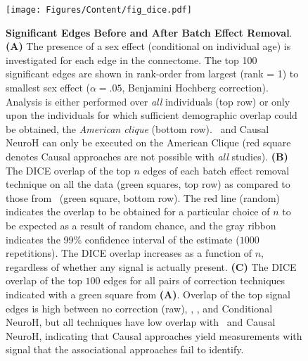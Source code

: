 \begin{figure}[h!]
    \centering
    \texttt{[image: Figures/Content/fig\_dice.pdf]}
    \caption{\textbf{Significant Edges Before and After Batch Effect Removal}. \textbf{(A)} The presence of a sex effect (conditional on individual age) is investigated for each edge in the connectome. The top 100 significant edges are shown in rank-order from largest (rank = 1) to smallest sex effect ($\alpha = .05$, Benjamini Hochberg \cite{BH} correction). Analysis is either performed over \textit{all} individuals (top row) or only upon the individuals for which sufficient demographic overlap could be obtained, the \textit{American clique} (bottom row). \cccombat~and Causal NeuroH can only be executed on the American Clique (red square denotes Causal approaches are not possible with \textit{all} studies). \textbf{(B)} The DICE overlap of the top $n$ edges of each batch effect removal technique on all the data (green squares, top row) as compared to those from \cccombat~(green square, bottom row). The red line (random) indicates the overlap to be obtained for a particular choice of $n$ to be expected as a result of random chance, and the gray ribbon indicates the 99\% confidence interval of the estimate ($1000$ repetitions). The DICE overlap increases as a function of $n$, regardless of whether any signal is actually present. \textbf{(C)} The DICE overlap of the top $100$ edges for all pairs of correction techniques indicated with a green square from \textbf{(A)}. Overlap of the top signal edges is high between no correction (raw), \Combat, \ccombat, and Conditional NeuroH, but all techniques have low overlap with \cccombat~and Causal NeuroH, indicating that Causal approaches yield measurements with signal that the associational approaches fail to identify.}
    \label{fig:different}
\end{figure}

